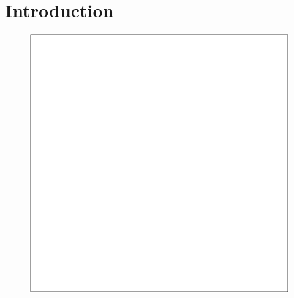 

\section{Introduction}
\label{sec:papertag.introduction}


\begin{figure}[tp!]
  \centering	
    \includegraphics[width=\columnwidth]{figures/localized/null.pdf}  
  \caption{
  }
  \label{fig:papertag.}
\end{figure}
